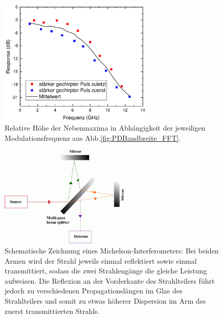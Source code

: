 \documentclass[bachelor,       %
               twoside,        %
               BCOR10mm,       %
               liststotoc,nomtotoc,bibtotoc, %
               english,ngerman, %
               final,          %
               ]{GAUBM}
\begin{document}
\begin{figure}[!htb]
	\centering
	\includegraphics[width=0.65\textwidth]{figures/PDBandwidth}
	\caption{Relative Höhe der Nebenmaxima in Abhängigkeit der jeweiligen Modulationsfrequenz aus Abb.\ref{fig:PDBandbreite_FFT}.}
	\label{fig:PDBandbreiteAusw}
\end{figure}

\begin{figure}[!htb]
	\centering
	\includegraphics[width=0.55\textwidth]{figures/multi_pass_beam_splitter.png}
	\caption{Schematische Zeichnung eines Michelson-Interferometers\protect\footnotemark:
	Bei beiden Armen wird der Strahl jeweils einmal reflektiert sowie einmal transmittiert, sodass die zwei Strahlengänge die gleiche Leistung aufweisen.
	Die Reflexion an der Vorderkante des Strahlteilers führt jedoch zu verschiedenen Propagationslängen im Glas des Strahlteilers und somit zu etwas höherer Dispersion im Arm des zuerst transmittierten Strahls.}
	\label{fig:Beamsplitter}
\end{figure}
\end{document}
